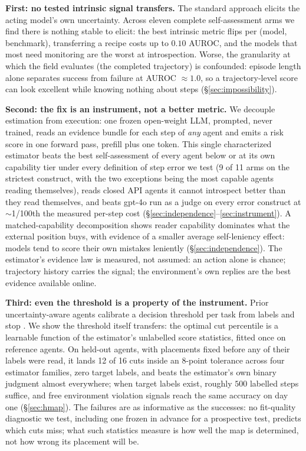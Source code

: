 \documentclass{article}
\begin{document}
\textbf{First: no tested intrinsic signal transfers.} The standard approach elicits
the acting model's own uncertainty. Across eleven complete self-assessment
arms we find there is nothing stable to elicit: the best intrinsic metric flips
per (model, benchmark), transferring a recipe
costs up to $0.10$ AUROC, and the models that most need monitoring are the
worst at introspection. Worse, the granularity at which the field evaluates
(the completed trajectory) is confounded: episode length alone separates
success from failure at AUROC $\approx 1.0$, so a trajectory-level score can
look excellent while knowing nothing about steps
(\S\ref{sec:impossibility}).

\textbf{Second: the fix is an instrument, not a better metric.} We decouple
estimation from execution: one frozen open-weight LLM, prompted, never
trained, reads an evidence bundle for each step of \emph{any} agent and
emits a risk score in one forward pass, prefill plus one token. This single
characterized estimator beats the best self-assessment of every agent below
or at its own capability tier under every definition of step error we test
(9 of 11 arms on the strictest construct, with the two exceptions being the
most capable agents reading themselves), reads closed API agents it cannot
introspect better than they read themselves, and beats gpt-4o run as a
judge on every error construct at $\sim$1/100th the measured per-step cost
(\S\ref{sec:independence}--\ref{sec:instrument}). A matched-capability decomposition shows reader capability dominates what the external position buys, with evidence of a smaller average self-leniency effect: models tend to score their own mistakes leniently (\S\ref{sec:independence}). The estimator's evidence law is measured, not
assumed: an action alone is chance; trajectory history carries the signal;
the environment's own replies are the best evidence available online.

\textbf{Third: even the threshold is a property of the instrument.} Prior
uncertainty-aware agents calibrate a decision threshold per task from
labels and stop \citep{han2024uala}. We show the threshold itself
transfers: the optimal cut percentile is a learnable function of the
estimator's unlabelled score statistics, fitted once on reference agents.
On held-out agents, with placements fixed before any of their labels were
read, it lands 12 of 16 cuts inside an 8-point tolerance across four
estimator families, zero target labels, and beats the estimator's own
binary judgment almost everywhere; when target labels exist, roughly $500$
labelled steps suffice, and free environment violation signals reach the same
accuracy on day one (\S\ref{sec:hmap}). The failures are as informative as the
successes: no fit-quality diagnostic we test, including one frozen in
advance for a prospective test, predicts which cuts miss; what such
statistics measure is how well the map is determined, not how wrong its
placement will be.
\end{document}
